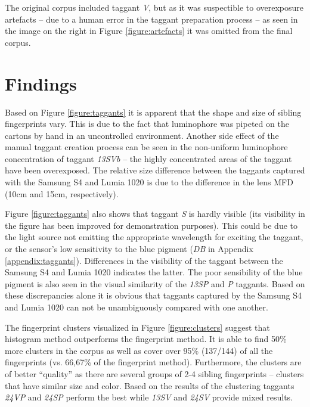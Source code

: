 \documentclass[thesis.tex]{subfiles}
\begin{document}
The original corpus included taggant \emph{V}, but as it was suspectible to overexposure artefacts -- due to a human error in the taggant preparation process -- as seen in the image on the right in Figure \ref{figure:artefacts} it was omitted from the final corpus.

\section{Findings}
\label{chapter:findings}

Based on Figure \ref{figure:taggants} it is apparent that the shape and size of sibling fingerprints vary. This is due to the fact that luminophore was pipeted on the cartons by hand in an uncontrolled environment. Another side effect of the manual taggant creation process can be seen in the non-uniform luminophore concentration of taggant \emph{13SVb} -- the highly concentrated areas of the taggant have been overexposed. The relative size difference between the taggants captured with the Samsung S4 and Lumia 1020 is due to the difference in the lens MFD (10cm and 15cm, respectively).

Figure \ref{figure:taggants} also shows that taggant \emph{S} is hardly visible (its visibility in the figure has been improved for demonstration purposes). This could be due to the light source not emitting the appropriate wavelength for exciting the taggant, or the sensor's low sensitivity to the blue pigment (\emph{DB} in Appendix \ref{appendix:taggants}). Differences in the visibility of the taggant between the Samsung S4 and Lumia 1020 indicates the latter. The poor sensibility of the blue pigment is also seen in the visual similarity of the \emph{13SP} and \emph{P} taggants. Based on these discrepancies alone it is obvious that taggants captured by the Samsung S4 and Lumia 1020 can not be unambiguously compared with one another.

The fingerprint clusters visualized in Figure \ref{figure:clusters} suggest that histogram method outperforms the fingerprint method. It is able to find 50\% more clusters in the corpus as well as cover over 95\% (137/144) of all the fingerprints (vs. 66,67\% of the fingerprint method). Furthermore, the clusters are of better ``quality'' as there are several groups of 2-4 sibling fingerprints -- clusters that have similar size and color. Based on the results of the clustering taggants \emph{24VP} and \emph{24SP} perform the best while \emph{13SV} and \emph{24SV} provide mixed results.
\end{document}
